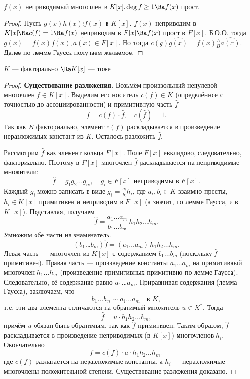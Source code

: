 \begin{proposition}
    \(f(x)\) неприводимый многочлен в \(K[x], \deg f \ge 1 \Ra f(x)\) прост.
\end{proposition}
\begin{proof}
    Пусть \(g(x)h(x) \vdots f(x)\) в \(K[x]\). \(f(x)\) неприводим в \(K[x] \Ra c(f) = 1 \Ra f(x)\) неприводим в \(F[x] \Ra f(x)\) прост в \(F[x]\). Б.О.О, тогда \(g(x) = f(x)\widetilde{f(x)}, \widetilde{a(x)} \in F[x]\). Но тогда \(c(g)\widehat{g(x)} = f(x)\frac{A}{B}\widehat{a(x)}\). Далее по лемме Гаусса получаем желаемое.
\end{proof}

\begin{theorem}
    \(K\) --- факторально \(\Ra K[x]\) --- тоже
\end{theorem}
\begin{proof}
    \textbf{Существование разложения.}  
    Возьмём произвольный ненулевой многочлен \(f \in K[x]\).  
    Выделим его носитель \(c(f) \in K\) (определённое с точностью до ассоциированности) и примитивную часть \(\widehat f\):
    \[
    f = c(f) \cdot \widehat f,\quad c(\widehat f) = 1.
    \]
    Так как \(K\) факториально, элемент \(c(f)\) раскладывается в произведение неразложимых констант из \(K\).  
    Осталось разложить \(\widehat f\).

    Рассмотрим \(\widehat f\) как элемент кольца \(F[x]\). Поле \(F[x]\) евклидово, следовательно, факториально. Поэтому в \(F[x]\) многочлен \(\widehat f\) раскладывается на неприводимые множители:
    \[
    \widehat f = g_1 g_2 \dots g_m,\quad g_i \in F[x]\text{ неприводимы в }F[x].
    \]
    Каждый \(g_i\) можно записать в виде \(g_i = \frac{a_i}{b_i} h_i\), где \(a_i, b_i \in K\) взаимно просты, \(h_i \in K[x]\) примитивен и неприводим в \(F[x]\) (а значит, по лемме Гаусса, и в \(K[x]\)). Подставляя, получаем
    \[
    \widehat f = \frac{a_1 \dots a_m}{b_1 \dots b_m} \, h_1 h_2 \dots h_m.
    \]
    Умножим обе части на знаменатель:
    \[
    (b_1 \dots b_m) \widehat f = (a_1 \dots a_m) \, h_1 h_2 \dots h_m.
    \]
    Левая часть — многочлен из \(K[x]\) с содержанием \(b_1 \dots b_m\) (поскольку \(\widehat f\) примитивен). Правая часть — произведение константы \(a_1 \dots a_m\) на примитивный многочлен \(h_1 \dots h_m\) (произведение примитивных примитивно по лемме Гаусса). Следовательно, её содержание равно \(a_1 \dots a_m\). Приравнивая содержания (лемма Гаусса), заключаем, что
    \[
    b_1 \dots b_m \sim a_1 \dots a_m \quad \text{в } K,
    \]
    т.е. эти два элемента отличаются на обратимый множитель \(u \in K^*\). Тогда
    \[
    \widehat f = u \cdot h_1 h_2 \dots h_m,
    \]
    причём \(u\) обязан быть обратимым, так как \(\widehat f\) примитивен. Таким образом, \(\widehat f\) раскладывается в произведение неприводимых (в \(K[x]\)) многочленов \(h_i\). Окончательно
    \[
    f = c(f) \cdot u \cdot h_1 h_2 \dots h_m,
    \]
    где \(c(f)\) разлагается на неразложимые константы, а \(h_i\) — неразложимые многочлены положительной степени. Существование разложения доказано.


\end{proof}
